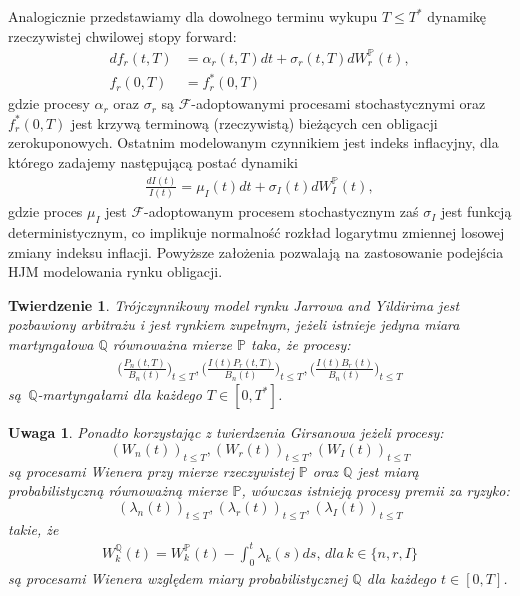 \documentclass{mini}
\theoremstyle{mythstyle}
\newtheorem{Twierdzenie}{Twierdzenie}[chapter]
\newtheorem{Uwaga}{Uwaga}[chapter]
\begin{document}
	Analogicznie przedstawiamy dla dowolnego terminu wykupu $T \le T^*$ dynamikę rzeczywistej chwilowej stopy forward:
	\begin{align*}
		df_r(t,T)  &= \alpha_r(t,T)dt + \sigma_r(t,T) dW_r^{\mathbb{P}}(t),\\
		 f_r(0,T) &= f_r^*(0,T)
	\end{align*}
	gdzie procesy $\alpha_r$ oraz $\sigma_r$ są $\mathcal{F}$-adoptowanymi procesami stochastycznymi oraz $f_r^*(0,T)$ jest krzywą terminową (rzeczywistą) bieżących cen obligacji zerokuponowych.  
	Ostatnim modelowanym czynnikiem jest indeks inflacyjny, dla którego zadajemy następującą postać dynamiki
	\begin{eqnarray*}
		\frac{dI(t)}{I(t)} = \mu_I(t)dt + \sigma_I(t)dW_I^{\mathbb{P}}(t),
	\end{eqnarray*}
	gdzie proces $\mu_I$ jest $\mathcal{F}$-adoptowanym procesem stochastycznym zaś $\sigma_I$ jest funkcją deterministycznym, co implikuje normalność rozkład logarytmu zmiennej losowej zmiany indeksu inflacji. Powyższe założenia pozwalają na zastosowanie podejścia HJM modelowania rynku obligacji.\\
	
	\begin{Twierdzenie}
		Trójczynnikowy model rynku Jarrowa and Yildirima jest pozbawiony arbitrażu i jest rynkiem zupełnym, jeżeli istnieje jedyna miara martyngałowa $\mathbb{Q}$ równoważna mierze ${\mathbb{P}}$ taka, że procesy:
		\begin{eqnarray*}
			\bigg(\frac{P_n(t,T)}{B_n(t)}\bigg)_{t\le T}, \bigg(\frac{I(t)P_r(t,T)}{B_n(t)}\bigg)_{t\le T}, \bigg(\frac{I(t)B_r(t)}{B_n(t)}\bigg)_{t\le T} 
		\end{eqnarray*}
		są \,$\mathbb{Q}$-martyngałami dla każdego $T \in [0,T^*]$.\\
	\end{Twierdzenie}	
	
	\begin{Uwaga}
		Ponadto korzystając z twierdzenia Girsanowa jeżeli procesy: $$(W_n(t))_{t\le T},(W_r(t))_{t\le T},(W_I(t))_{t\le T}$$ są procesami Wienera przy mierze rzeczywistej $\mathbb{P}$ oraz $\mathbb{Q}$ jest miarą probabilistyczną równoważną mierze $\mathbb{P}$, wówczas istnieją procesy premii za ryzyko:  $$(\lambda_n(t))_{t\le T},(\lambda_r(t))_{t\le T},(\lambda_I(t))_{t\le T}$$ takie, że
		\begin{eqnarray*}
			W^\mathbb{Q}_k(t) = W^\mathbb{P}_k(t) - \int_{0}^{t}\lambda_k(s)ds ,\,dla\, k\in\{n,r,I\}
		\end{eqnarray*}
		są procesami Wienera względem miary probabilistycznej $\mathbb{Q}$ dla każdego $t \in [0,T]$. 
	\end{Uwaga}
	
\end{document}
